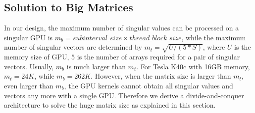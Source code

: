 
\vspace{-0.15in}
\subsection{Solution to Big Matrices} \label{sec_huge}
\vspace{-0.1in}
In our design, the maximum number of singular values can be processed on a singular GPU is $m_b = subinterval\_size \times thread\_block\_size$,
while the maximum number of singular vectors are determined by $m_t = \sqrt{U / (5 * S)}$,
where $U$ is the memory size of GPU, $5$ is the number of arrays required for a pair of singular vectors.
Usually, $m_b$ is much larger than $m_t$.
For Tesla K40c with 16GB memory, $m_t = 24K$, while $m_b = 262K$.
However, when the matrix size is larger than $m_t$, even larger than $m_b$,
the GPU kernels cannot obtain all singular values and vectors any more with a single GPU.
Therefore we derive a divide-and-conquer architecture to solve the huge matrix size as explained in this section.

